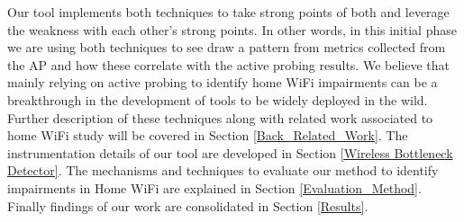 Our tool implements both techniques to take strong points of both and leverage the weakness with each other's strong points. In other words, in this initial phase we are using both techniques to see draw a pattern from metrics collected from the AP and how these correlate with the active probing results. We believe that mainly relying on active probing to identify home WiFi impairments can be a breakthrough in the development of tools to be widely deployed in the wild. Further description of these techniques along with related work associated to home WiFi study will be covered in Section \ref{Back_Related_Work}. The instrumentation details of our tool are developed in Section \ref{Wireless Bottleneck Detector}. The mechanisms and techniques to evaluate our method to identify impairments in Home WiFi are explained in Section \ref{Evaluation_Method}. Finally findings of our work are consolidated in Section \ref{Results}.